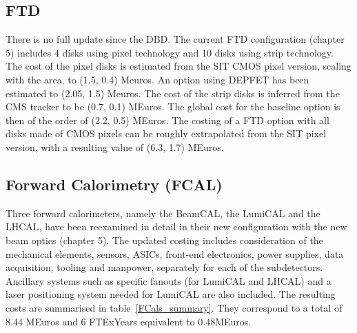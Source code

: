 \subsection{FTD}
There is no full update since the DBD. The current FTD configuration (chapter 5) includes 4 disks using pixel technology and 10 disks using strip technology. The cost of the pixel disks is estimated from the SIT CMOS pixel version, scaling with the area, to (1.5, 0.4) Meuros. An option using DEPFET has been estimated to (2.05, 1.5) Meuros.
The cost of the strip disks is inferred from the CMS tracker to be (0.7, 0.1) MEuros. The global cost for the baseline option is then of the order of (2.2, 0.5) MEuros. The costing of a FTD option with all disks made of CMOS pixels can be roughly extrapolated from the SIT pixel version, with a resulting value of (6.3, 1.7) MEuros.


\subsection{Forward Calorimetry (FCAL)}

Three forward calorimeters, namely the BeamCAL, the LumiCAL and the LHCAL, have been reexamined in detail in their new configuration with the new beam optics (chapter 5). The updated costing includes consideration of the mechanical elements, sensors, ASICs, front-end electronics, power supplies, data acquisition, tooling and manpower, separately for each of the subdetectors. Ancillary systems such as specific fanouts (for LumiCAL and LHCAL) and a laser positioning system needed for LumiCAL are also included. The resulting costs are summarised in table~\ref{FCals_summary}. They correspond to a total of 8.44 MEuros and 6 FTExYears equivalent to 0.48MEuros.


